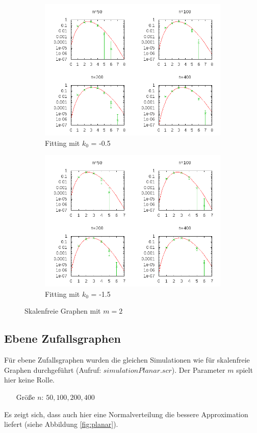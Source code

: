 \documentclass[10pt]{article}
\begin{document}
\begin{figure}[h!]
\begin{subfigure}{.5\textwidth}
  \centering
  \includegraphics[width=1\linewidth]{../Results/Power_constant_k-05.png}
  \caption{Fitting mit $k_0$ = -0.5}
\end{subfigure}%
\begin{subfigure}{.5\textwidth}
  \centering
  \includegraphics[width=1\linewidth]{../Results/Power_constant_k-15.png}
  \caption{Fitting mit $k_0$ = -1.5}
\end{subfigure}
\caption{Skalenfreie Graphen mit $m=2$}
\label{fig:k_-0.51.5}
\end{figure}
\newpage

\subsection{Ebene Zufallsgraphen}
Für ebene Zufallsgraphen wurden die gleichen Simulationen wie für skalenfreie Graphen durchgeführt (Aufruf: $simulationPlanar.scr$). Der Parameter $m$ spielt hier keine Rolle.
\begin{itemize}
\item[\quad Größe $n$:] $50,100,200,400$
\end{itemize}
Es zeigt sich, dass auch hier eine Normalverteilung die bessere Approximation liefert (siehe Abbildung \ref{fig:planar}).
\end{document}
